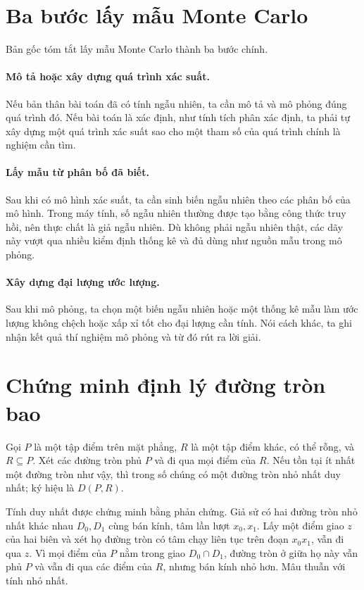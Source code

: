 \documentclass[11pt]{article}
\begin{document}
\appendix

\section{Ba bước lấy mẫu Monte Carlo}
\label{app:monte-carlo}

Bản gốc tóm tắt lấy mẫu Monte Carlo thành ba bước chính.

\paragraph{Mô tả hoặc xây dựng quá trình xác suất.}
Nếu bản thân bài toán đã có tính ngẫu nhiên, ta cần mô tả và mô phỏng đúng quá
trình đó. Nếu bài toán là xác định, như tính tích phân xác định, ta phải tự
xây dựng một quá trình xác suất sao cho một tham số của quá trình chính là
nghiệm cần tìm.

\paragraph{Lấy mẫu từ phân bố đã biết.}
Sau khi có mô hình xác suất, ta cần sinh biến ngẫu nhiên theo các phân bố của
mô hình. Trong máy tính, số ngẫu nhiên thường được tạo bằng công thức truy hồi,
nên thực chất là giả ngẫu nhiên. Dù không phải ngẫu nhiên thật, các dãy này
vượt qua nhiều kiểm định thống kê và đủ dùng như nguồn mẫu trong mô phỏng.

\paragraph{Xây dựng đại lượng ước lượng.}
Sau khi mô phỏng, ta chọn một biến ngẫu nhiên hoặc một thống kê mẫu làm ước
lượng không chệch hoặc xấp xỉ tốt cho đại lượng cần tính. Nói cách khác, ta
ghi nhận kết quả thí nghiệm mô phỏng và từ đó rút ra lời giải.

\section{Chứng minh định lý đường tròn bao}
\label{app:mec-proof}

Gọi \(P\) là một tập điểm trên mặt phẳng, \(R\) là một tập điểm khác, có thể
rỗng, và \(R\subseteq P\). Xét các đường tròn phủ \(P\) và đi qua mọi điểm của
\(R\). Nếu tồn tại ít nhất một đường tròn như vậy, thì trong số chúng có một
đường tròn nhỏ nhất duy nhất; ký hiệu là \(D(P,R)\).

Tính duy nhất được chứng minh bằng phản chứng. Giả sử có hai đường tròn nhỏ
nhất khác nhau \(D_0,D_1\) cùng bán kính, tâm lần lượt \(x_0,x_1\). Lấy một
điểm giao \(z\) của hai biên và xét họ đường tròn có tâm chạy liên tục trên
đoạn \(x_0x_1\), vẫn đi qua \(z\). Vì mọi điểm của \(P\) nằm trong giao
\(D_0\cap D_1\), đường tròn ở giữa họ này vẫn phủ \(P\) và vẫn đi qua các điểm
của \(R\), nhưng bán kính nhỏ hơn. Mâu thuẫn với tính nhỏ nhất.
\end{document}
